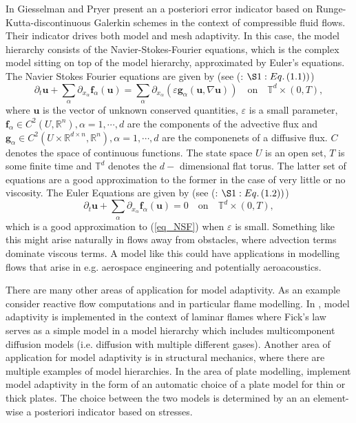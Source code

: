 \documentclass[12pt,a4paper]{article}
\theoremstyle{definition}
\begin{document}
In \cite{giesselmann2017posteriori} Giesselman and Pryer present an a posteriori error indicator based on Runge-Kutta-discontinuous Galerkin schemes in the context of compressible fluid flows.  Their indicator drives both model and mesh adaptivity.  In this case, the model hierarchy consists of the Navier-Stokes-Fourier equations, which is the complex model sitting on top of the model hierarchy, approximated by Euler's equations.   The Navier Stokes Fourier equations are given by (see (\cite{giesselmann2017posteriori}:  $\S 1: Eq. \left(1.1\right))$)
\begin{equation}\label{eq_NSF}
\partial_t\textbf{u} +\sum_{\alpha}\partial_{x_\alpha}\textbf{f}_{\alpha}\left(\textbf{u}\right) = \sum_{\alpha}\partial_{x_\alpha}  \left(\varepsilon \textbf{g}_{\alpha}\left(\textbf{u},\nabla\textbf{u}\right)\right)\quad \text{on} \quad \mathbb{T}^d \times \left(0,T\right),
\end{equation}
where $\textbf{u}$ is the vector of unknown conserved quantities, $\varepsilon$ is a small parameter, $\textbf{f}_{\alpha}\in C^2\left(U,\mathbb{R}^n\right), \alpha = 1,\cdots,d$ are the components of the advective flux and $\textbf{g}_{\alpha}\in C^2\left(U\times \mathbb{R}^{d\times n},\mathbb{R}^n\right), \alpha = 1,\cdots,d $ are the componenets of a diffusive flux.  $C$ denotes the space of continuous functions. The state space $U$ is an open set, $T$ is some finite time and $\mathbb{T}^d$ denotes the $d-$ dimensional flat torus. The latter set of equations are a good approximation to the former in the case of very little or no viscosity.  The Euler Equations are given by  (see (\cite{giesselmann2017posteriori}:  $\S 1: Eq. \left(1.2\right))$)
\begin{equation}
\partial_t\textbf{u} +\sum_{\alpha}\partial_{x_\alpha}\textbf{f}_{\alpha}\left(\textbf{u}\right) = 0\quad \text{on} \quad \mathbb{T}^d \times \left(0,T\right),
\end{equation}
which is a good approximation to (\ref{eq_NSF}) when $\varepsilon$ is small.  Something like this might arise naturally in flows away from obstacles, where advection terms dominate viscous terms.  A model like this could have applications in modelling flows that arise in e.g. aerospace engineering and potentially aeroacoustics. 

There are many other areas of application for model adaptivity.  As an example consider reactive flow computations and in particular flame modelling.  In \cite{becker2007mesh}, model adaptivity is implemented in the context of laminar flames where Fick's law serves as a simple model in a model hierarchy which includes multicomponent diffusion models (i.e. diffusion with multiple different gases).    
Another area of application for model adaptivity is in structural mechanics, where there are multiple examples of model hierarchies.  In the area of plate modelling, \cite{bohinc2009model} implement model adaptivity in the form of an automatic choice of a plate model for thin or thick plates.  The choice between the two models is determined by an an element-wise a posteriori indicator based on stresses. 
\end{document}
